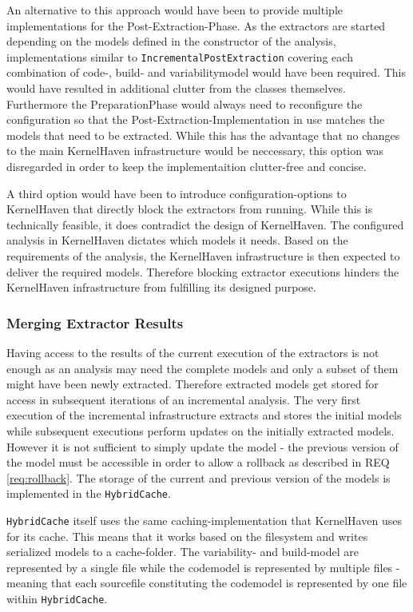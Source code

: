 \documentclass[a4paper]{article}
\begin{document}
An alternative to this approach would have been to provide multiple implementations for the Post-Extraction-Phase. As the extractors are started depending on the models defined in the constructor of the analysis, implementations similar to \texttt{IncrementalPostExtraction} covering each combination of code-, build- and variabilitymodel would have been required. This would have resulted in additional clutter from the classes themselves. Furthermore the PreparationPhase would always need to reconfigure the configuration so that the Post-Extraction-Implementation in use matches the models that need to be extracted. While this has the advantage that no changes to the main KernelHaven infrastructure would be neccessary, this option was disregarded in order to keep the implementaition clutter-free and concise.

A third option would have been to introduce configuration-options to KernelHaven that directly block the extractors from running. While this is technically feasible, it does contradict the design of KernelHaven. The configured analysis in KernelHaven dictates which models it needs. Based on the requirements of the analysis, the KernelHaven infrastructure is then expected to deliver the required models.  Therefore blocking extractor executions hinders the KernelHaven infrastructure from fulfilling its designed purpose. 

\subsubsection{Merging Extractor Results}

Having access to the results of the current execution of the extractors is not enough as an analysis may need the complete models and only a subset of them might have been newly extracted. Therefore extracted models get stored for access in subsequent iterations of an incremental analysis. The very first execution of the incremental infrastructure extracts and stores the initial models while subsequent executions perform updates on the initially extracted models. However it is not sufficient to simply update the model - the previous version of the model must be accessible in order to allow a rollback as described in REQ \ref{req:rollback}. The storage of the current and previous version of the models is implemented in the \texttt{HybridCache}.

\texttt{HybridCache} itself uses the same caching-implementation that KernelHaven uses for its cache. This means that it works based on the filesystem and writes serialized models to a cache-folder. The variability- and build-model are represented by a single file while the codemodel is represented by multiple files - meaning that each sourcefile constituting the codemodel is represented by one file within \texttt{HybridCache}.
 
\end{document}
